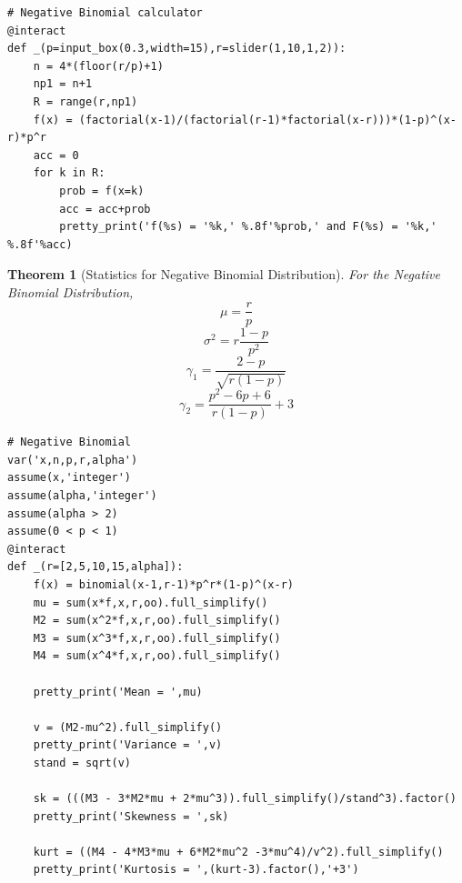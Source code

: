 \documentclass[10pt,]{book}
\theoremstyle{plain}
\newtheorem{theorem}{Theorem}[section]
\theoremstyle{definition}
\theoremstyle{definition}
\theoremstyle{definition}
\numberwithin{equation}{section}
\begin{document}
\begin{lstlisting}[style=sageinput]
# Negative Binomial calculator
@interact
def _(p=input_box(0.3,width=15),r=slider(1,10,1,2)):
    n = 4*(floor(r/p)+1)
    np1 = n+1
    R = range(r,np1)
    f(x) = (factorial(x-1)/(factorial(r-1)*factorial(x-r)))*(1-p)^(x-r)*p^r
    acc = 0
    for k in R:
        prob = f(x=k)
        acc = acc+prob
        pretty_print('f(%s) = '%k,' %.8f'%prob,' and F(%s) = '%k,' %.8f'%acc)
\end{lstlisting}

%
\begin{theorem}[{Statistics for Negative Binomial Distribution}]\label{theorem-44}
For the Negative Binomial Distribution, 
		\begin{equation*}\mu = \frac{r}{p}\end{equation*}\begin{equation*}\sigma^2 = r \frac{1-p}{p^2}\end{equation*}\begin{equation*}\gamma_1 = \frac{2-p}{\sqrt{r(1-p)}}\end{equation*}\begin{equation*}\gamma_2 = \frac{p^2-6p+6}{r(1-p)} + 3\end{equation*}\begin{lstlisting}[style=sageinput]
# Negative Binomial
var('x,n,p,r,alpha')
assume(x,'integer')
assume(alpha,'integer')
assume(alpha > 2)
assume(0 < p < 1)
@interact
def _(r=[2,5,10,15,alpha]):
    f(x) = binomial(x-1,r-1)*p^r*(1-p)^(x-r)
    mu = sum(x*f,x,r,oo).full_simplify()
    M2 = sum(x^2*f,x,r,oo).full_simplify()
    M3 = sum(x^3*f,x,r,oo).full_simplify()
    M4 = sum(x^4*f,x,r,oo).full_simplify()
        
    pretty_print('Mean = ',mu)
    
    v = (M2-mu^2).full_simplify()
    pretty_print('Variance = ',v)
    stand = sqrt(v)
    
    sk = (((M3 - 3*M2*mu + 2*mu^3)).full_simplify()/stand^3).factor()
    pretty_print('Skewness = ',sk)
    
    kurt = ((M4 - 4*M3*mu + 6*M2*mu^2 -3*mu^4)/v^2).full_simplify()
    pretty_print('Kurtosis = ',(kurt-3).factor(),'+3')
\end{lstlisting}
\end{theorem}
\typeout{************************************************}
\typeout{************************************************}
\end{document}
